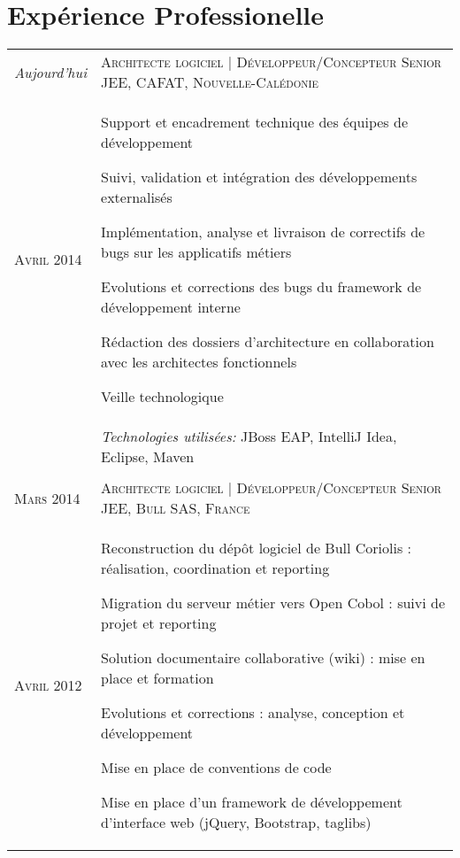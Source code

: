 \section{\texorpdfstring{\color{Blue}Expérience Professionelle}{Expérience Professionelle}}
\begin{longtable}{R{2.5cm}|p{14.8cm}}
  \emph{Aujourd'hui} & \textsc{Architecte logiciel | Développeur/Concepteur Senior JEE, CAFAT, Nouvelle-Calédonie}\\
  \textsc{Avril 2014} & 
    \begin{compactitem}
      \item Support et encadrement technique des équipes de développement
      \item Suivi, validation et intégration des développements externalisés
      \item Implémentation, analyse et livraison de correctifs de bugs sur les applicatifs métiers
      \item Evolutions et corrections des bugs du framework de développement interne
      \item Rédaction des dossiers d'architecture en collaboration avec les architectes fonctionnels
      \item Veille technologique
    \end{compactitem}
  \\& 
  \footnotesize{\emph{Technologies utilisées:} JBoss EAP, IntelliJ Idea, Eclipse, Maven }\\
  \\
  \textsc{Mars 2014} & \textsc{Architecte logiciel | Développeur/Concepteur Senior JEE, Bull SAS, France}\\
  \textsc{Avril 2012} & 
  \small{
    \begin{compactitem}
      \item Reconstruction du dépôt logiciel de Bull Coriolis : réalisation, coordination et reporting
      \item Migration du serveur métier vers Open Cobol : suivi de projet et reporting
      \item Solution documentaire collaborative (wiki) : mise en place et formation
      \item Evolutions et corrections : analyse, conception et développement
      \item Mise en place de conventions de code
      \item Mise en place d'un framework de développement d'interface web (jQuery, Bootstrap, taglibs)

\end{compactitem}}
\end{longtable}
